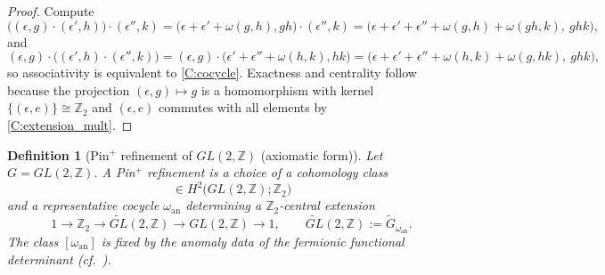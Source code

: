 \documentclass[11pt]{article}
\newtheorem{definition}[theorem]{Definition}
\theoremstyle{remark}
\begin{document}
\begin{proof}
Compute
\begin{equation}
\bigl((\epsilon,g)\cdot(\epsilon',h)\bigr)\cdot(\epsilon'',k)
=
\bigl(\epsilon+\epsilon'+\omega(g,h),gh\bigr)\cdot(\epsilon'',k)
=
\bigl(\epsilon+\epsilon'+\epsilon''+\omega(g,h)+\omega(gh,k),\ ghk\bigr),
\end{equation}
and
\begin{equation}
(\epsilon,g)\cdot\bigl((\epsilon',h)\cdot(\epsilon'',k)\bigr)
=
(\epsilon,g)\cdot\bigl(\epsilon'+\epsilon''+\omega(h,k),hk\bigr)
=
\bigl(\epsilon+\epsilon'+\epsilon''+\omega(h,k)+\omega(g,hk),\ ghk\bigr),
\end{equation}
so associativity is equivalent to \eqref{C:cocycle}.
Exactness and centrality follow because the projection $(\epsilon,g)\mapsto g$ is a homomorphism with kernel $\{(\epsilon,e)\}\cong\mathbb Z_{2}$ and $(\epsilon,e)$ commutes with all elements by \eqref{C:extension_mult}.
\end{proof}

\begin{definition}[Pin$^{+}$ refinement of $GL(2,\mathbb Z)$ (axiomatic form)]
Let $G=GL(2,\mathbb Z)$.
A \emph{Pin$^{+}$ refinement} is a choice of a cohomology class
\begin{equation}
[\omega_{\mathrm{an}}]\in H^{2}\bigl(GL(2,\mathbb Z);\mathbb Z_{2}\bigr)
\label{C:omega_class}
\end{equation}
and a representative cocycle $\omega_{\mathrm{an}}$ determining a $\mathbb Z_{2}$-central extension
\begin{equation}
1\longrightarrow \mathbb Z_{2}\longrightarrow \widetilde{GL}(2,\mathbb Z)\longrightarrow GL(2,\mathbb Z)\longrightarrow 1,
\qquad
\widetilde{GL}(2,\mathbb Z):=\widetilde{G}_{\omega_{\mathrm{an}}}.
\label{C:Pinplus_GL}
\end{equation}
The class $[\omega_{\mathrm{an}}]$ is fixed by the anomaly data of the fermionic functional determinant (cf.\ \cite{DebrayDieriglHeckmanMontero2021}).
\end{definition}
\end{document}
